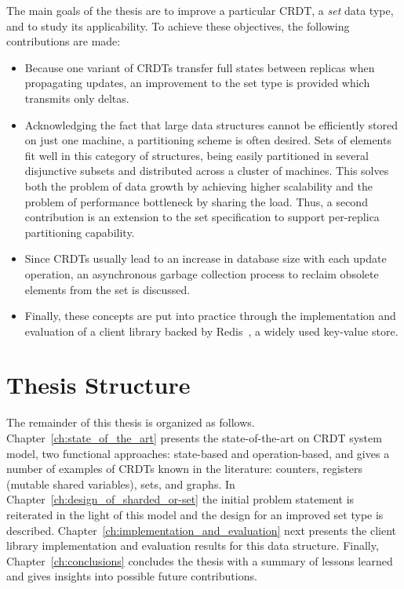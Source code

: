 The main goals of the thesis are to improve a particular CRDT, a \textit{set}
data type, and to study its applicability. To achieve these objectives, the
following contributions are made:
\begin{itemize}
  \item Because one variant of CRDTs transfer full states between replicas when
  propagating updates, an improvement to the set type is provided which
  transmits only deltas.
  \item Acknowledging the fact that large data structures cannot be efficiently
  stored on just one machine, a partitioning scheme is often desired. Sets of
  elements fit well in this category of structures, being easily partitioned in
  several disjunctive subsets and distributed across a cluster of machines.
  This solves both the problem of data growth by achieving higher scalability
  and the problem of performance bottleneck by sharing the load. Thus, a second
  contribution is an extension to the set specification to support per-replica
  partitioning capability.
  \item Since CRDTs usually lead to an increase in database size with each
  update operation, an asynchronous garbage collection process to reclaim
  obsolete elements from the set is discussed.
  \item Finally, these concepts are put into practice through the implementation
  and evaluation of a client library backed by Redis~\cite{redis}, a widely used
  key-value store.
\end{itemize}

\section{Thesis Structure}
\label{sec:thesis_structure}

The remainder of this thesis is organized as follows.
Chapter~\ref{ch:state_of_the_art} presents the state-of-the-art on CRDT
system model, two functional approaches: state-based and operation-based, and
gives a number of examples of CRDTs known in the literature: counters,
registers (mutable shared variables), sets, and graphs. In
Chapter~\ref{ch:design_of_sharded_or-set} the initial problem statement is
reiterated in the light of this model and the design for an improved set type is
described. Chapter~\ref{ch:implementation_and_evaluation} next presents the
client library implementation and evaluation results for this data structure.
Finally, Chapter~\ref{ch:conclusions} concludes the thesis with a summary of
lessons learned and gives insights into possible future contributions.
